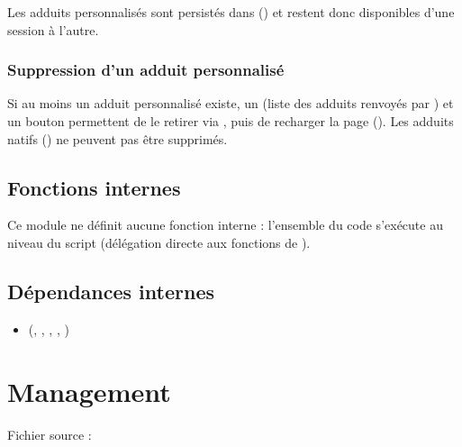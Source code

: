 \documentclass[letterpaper,10pt,english]{sphinxmanual}
\begin{document}
\sphinxAtStartPar
Les adduits personnalisés sont persistés dans  ()
et restent donc disponibles d’une session à l’autre.


\subsection{Suppression d’un adduit personnalisé}
\label{\detokenize{4_Resources:suppression-d-un-adduit-personnalise}}
\sphinxAtStartPar
Si au moins un adduit personnalisé existe, un  (liste des
adduits renvoyés par ) et un
bouton  permettent de le retirer via
, puis de recharger la page
(). Les adduits natifs () ne peuvent
pas être supprimés.


\section{Fonctions internes}
\label{\detokenize{4_Resources:fonctions-internes}}
\sphinxAtStartPar
Ce module ne définit aucune fonction interne : l’ensemble du code s’exécute
au niveau du script (délégation directe aux fonctions de
{\hyperref[\detokenize{api:module-utils.neutral_mass}]{}}).


\section{Dépendances internes}
\label{\detokenize{4_Resources:dependances-internes}}\begin{itemize}
\item {} 
\sphinxAtStartPar
{\hyperref[\detokenize{api:module-utils.neutral_mass}]{}} (, ,
, , )

\end{itemize}

\sphinxstepscope


\chapter{Management}
\label{\detokenize{5_Management:management}}\label{\detokenize{5_Management::doc}}
\sphinxAtStartPar
Fichier source : 
\end{document}
